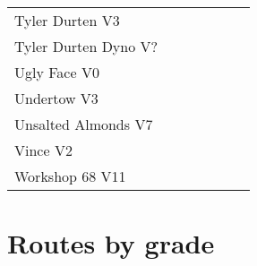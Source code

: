 \begin{center}
\begin{supertabular}{p{0.65\linewidth}r}
Tyler Durten V3 & \pageref{rt:Tyler Durten} \\
Tyler Durten Dyno V? & \pageref{vr:Tyler Durten Dyno} \\
Ugly Face V0 & \pageref{rt:Ugly Face} \\
Undertow V3 & \pageref{rt:Undertow} \\
Unsalted Almonds V7 & \pageref{rt:Unsalted Almonds} \\
Vince V2 & \pageref{rt:Vince} \\
Workshop 68 V11 & \pageref{rt:Workshop 68} \\
\end{supertabular}
\end{center}
\section{Routes by grade}
